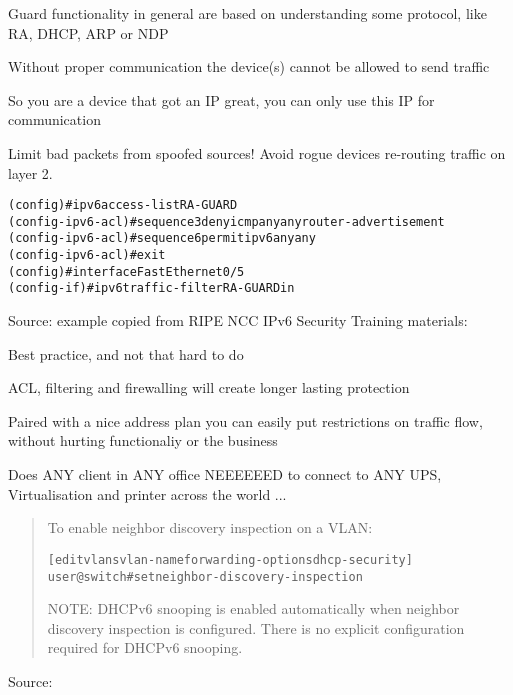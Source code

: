 \documentclass[Screen16to9,17pt]{foils}
\begin{document}
\begin{list2}
\item Guard functionality in general are based on understanding some protocol, like RA, DHCP, ARP or NDP
\item Without proper communication the device(s) cannot be allowed to send traffic
\item So you are a device that got an IP great, you can only use this IP for communication
\end{list2}

Limit bad packets from spoofed sources! Avoid rogue devices re-routing traffic on layer 2.




\begin{alltt}
 (config)#ipv6 access-list RA-GUARD
 (config-ipv6-acl)#sequence 3 deny icmp any any router-advertisement
 (config-ipv6-acl)#sequence 6 permit ipv6 any any
 (config-ipv6-acl)#exit
 (config)#interface FastEthernet0/5
 (config-if)#ipv6 traffic-filter RA-GUARD in
\end{alltt}
Source: example copied from RIPE NCC IPv6 Security Training materials:\\

\begin{list2}
\item Best practice, and not that hard to do
\item ACL, filtering and firewalling will create longer lasting protection
\item Paired with a nice address plan you can easily put restrictions on traffic flow, without hurting functionaliy or the business
\item Does ANY client in ANY office NEEEEEED to connect to ANY UPS, Virtualisation and printer across the world ...
\end{list2}




\begin{quote}
To enable neighbor discovery inspection on a VLAN:
\begin{alltt}
[edit vlans vlan-name forwarding-options dhcp-security]
user@switch# set  neighbor-discovery-inspection
\end{alltt}

NOTE: DHCPv6 snooping is enabled automatically when neighbor discovery inspection is configured. There is no explicit configuration required for DHCPv6 snooping.
\end{quote}
Source: \\ {\footnotesize{}}
\end{document}
